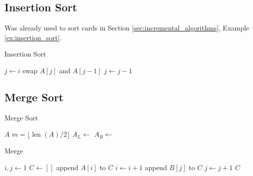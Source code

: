 \subsection{Insertion Sort}
\label{sec:insertion_sort}
Was already used to sort cards in Section \ref{sec:incremental_algorithms}, Example \ref{ex:insertion_sort}.
\begin{algorithm}[htb]
    \caption{Insertion Sort}
    \label{alg:insertion_sort}
    \begin{algorithmic}[1]
            \State $j \gets i$
                \State swap $A[j]$ and $A[j-1]$
                \State $j \gets j - 1$
            \EndWhile
        \EndFor
    \EndFunction
\end{algorithmic}
\end{algorithm}


\subsection{Merge Sort}
\label{sec:merge_sort}


\begin{algorithm}[htb]
    \caption{Merge Sort}
    \label{alg:merge_sort}
    \begin{algorithmic}[1]
     
        \State \Return $A$
    \EndIf
    \State $m = \lfloor \operatorname{len}(A) / 2 \rfloor$  \label{alg:merge_sort:midpoint}
    \State $A_L \gets$   \label{alg:merge_sort:recurse_left}
    \State $A_R \gets$   \label{alg:merge_sort:recurse_right}
    \State \Return {} 
\EndFunction
    \end{algorithmic}
\end{algorithm}


\begin{algorithm}[htb]
    \caption{Merge}
    \label{alg:merge}
    \begin{algorithmic}[1]
    \State $i,j \gets 1$
    \State $C \gets []$
            \State append $A[i]$ to $C$
            \State $i \gets i + 1$
        \Else
            \State append $B[j]$ to $C$
            \State $j \gets j + 1$
        \EndIf
    \EndWhile
    \State \Return $C$
\EndFunction
\end{algorithmic}
\end{algorithm}


